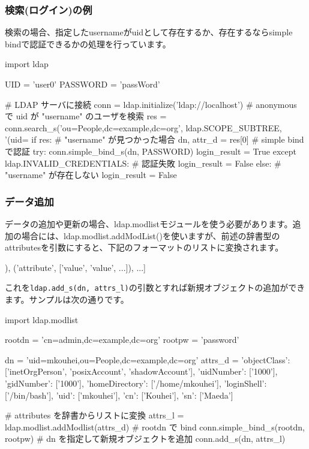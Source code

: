 \documentclass[mingoth,a4paper]{jsarticle}
\begin{document}
\subsubsection{検索(ログイン)の例}
検索の場合、指定したusernameがuidとして存在するか、存在するならsimple bindで認証できるかの処理を行っています。
\begin{commandline}
import ldap

UID = 'user0'
PASSWORD = 'passWord'

# LDAP サーバに接続
conn = ldap.initialize('ldap://localhost')
# anonymous で uid が "username" のユーザを検索
res = conn.search_s('ou=People,dc=example,dc=org', ldap.SCOPE_SUBTREE,
                    '(uid=%
if res:
    # "username" が見つかった場合
    dn, attr_d = res[0]
    # simple bind で認証
    try:
        conn.simple_bind_s(dn, PASSWORD)
        login_result = True
    except ldap.INVALID_CREDENTIALS:
        # 認証失敗
        login_result = False
else:
    # "username" が存在しない
    login_result = False
\end{commandline}

\subsubsection{データ追加}

データの追加や更新の場合、ldap.modlistモジュールを使う必要があります。追加の場合には、ldap.modlist.addModList()を使いますが、前述の辞書型のattributesを引数にすると、下記のフォーマットのリストに変換されます。
\begin{commandline}
[('attribute', ['value']),
 ('attribute', ['value', 'value', ...]), ...]
\end{commandline}

これを\texttt{ldap.add\_s(dn, attrs\_l)}の引数とすれば新規オブジェクトの追加ができます。サンプルは次の通りです。

\begin{commandline}
import ldap.modlist

rootdn = 'cn=admin,dc=example,dc=org'
rootpw = 'password'

dn = 'uid=mkouhei,ou=People,dc=example,dc=org'
attrs_d = {'objectClass': ['inetOrgPerson', 'posixAccount', 'shadowAccount'],
           'uidNumber': ['1000'],
           'gidNumber': ['1000'],
           'homeDirectory': ['/home/mkouhei'],
           'loginShell': ['/bin/bash'],
           'uid': ['mkouhei'],
           'cn': ['Kouhei'],
           'sn': ['Maeda']}

# attributes を辞書からリストに変換
attrs_l = ldap.modlist.addModlist(attrs_d)
# rootdn で bind
conn.simple_bind_s(rootdn, rootpw)
# dn を指定して新規オブジェクトを追加
conn.add_s(dn, attrs_l)
\end{commandline}
\end{document}

